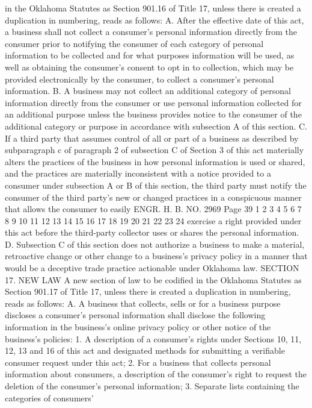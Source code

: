 in the Oklahoma Statutes as Section 901.16 of Title 17, unless there
is created a duplication in numbering, reads as follows:
A. After the effective date of this act, a business shall not
collect a consumer's personal information directly from the consumer
prior to notifying the consumer of each category of personal
information to be collected and for what purposes information will
be used, as well as obtaining the consumer's consent to opt in to
collection, which may be provided electronically by the consumer, to
collect a consumer's personal information.
B. A business may not collect an additional category of
personal information directly from the consumer or use personal
information collected for an additional purpose unless the business
provides notice to the consumer of the additional category or
purpose in accordance with subsection A of this section.
C. If a third party that assumes control of all or part of a
business as described by subparagraph c of paragraph 2 of subsection
C of Section 3 of this act materially alters the practices of the
business in how personal information is used or shared, and the
practices are materially inconsistent with a notice provided to a
consumer under subsection A or B of this section, the third party
must notify the consumer of the third party's new or changed
practices in a conspicuous manner that allows the consumer to easily
ENGR. H. B. NO. 2969 Page 39
1
2
3
4
5
6
7
8
9
10
11
12
13
14
15
16
17
18
19
20
21
22
23
24
exercise a right provided under this act before the third-party
collector uses or shares the personal information.
D. Subsection C of this section does not authorize a business
to make a material, retroactive change or other change to a
business's privacy policy in a manner that would be a deceptive
trade practice actionable under Oklahoma law.
SECTION 17. NEW LAW A new section of law to be codified
in the Oklahoma Statutes as Section 901.17 of Title 17, unless there
is created a duplication in numbering, reads as follows:
A. A business that collects, sells or for a business purpose
discloses a consumer's personal information shall disclose the
following information in the business's online privacy policy or
other notice of the business's policies:
1. A description of a consumer's rights under Sections 10, 11,
12, 13 and 16 of this act and designated methods for submitting a
verifiable consumer request under this act;
2. For a business that collects personal information about
consumers, a description of the consumer's right to request the
deletion of the consumer's personal information;
3. Separate lists containing the categories of consumers'
